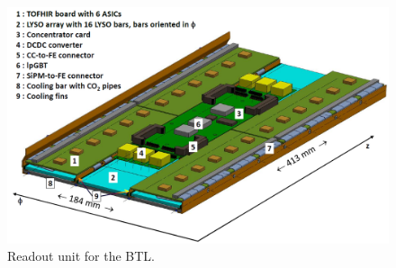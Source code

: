 \begin{figure}[h]
	\centering
	\includegraphics[width=1.0\linewidth]{Figures/BTL_readoutunit}
	\caption[Readout unit for the BTL.]{Readout unit for the BTL.}
	\label{fig:btlreadoutunit}
\end{figure}

